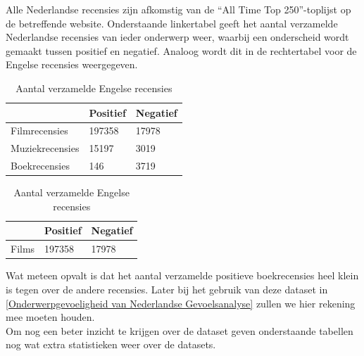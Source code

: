 Alle Nederlandse recensies zijn afkomstig van de ``All Time Top 250''-toplijst op de betreffende website. Onderstaande linkertabel geeft het aantal verzamelde Nederlandse recensies van ieder onderwerp weer, waarbij een onderscheid wordt gemaakt tussen positief en negatief. Analoog wordt dit in de rechtertabel voor de Engelse recensies weergegeven.\\

\begin{table}[h]
\centering
\setlength\tabcolsep{2pt}
\begin{minipage}[t]{0.48\textwidth}
\centering
\begin{tabular}{l|l|l|}
\cline{2-3}
                                      & Positief & Negatief \\ \hline
\multicolumn{1}{|l|}{Filmrecensies}   & 197358   & 17978    \\ \hline
\multicolumn{1}{|l|}{Muziekrecensies} & 15197    & 3019     \\ \hline
\multicolumn{1}{|l|}{Boekrecensies}   & 146      & 3719     \\ \hline
\end{tabular}
\caption{Aantal verzamelde Nederlandse recensies} 
\label{tabel: aantal verzamelde Nederlandse recensies}
\end{minipage}%
\hfill
\begin{minipage}[t]{0.48\textwidth}
\centering
\begin{tabular}{l|l|l|}
\cline{2-3}
                            & Positief & Negatief \\ \hline
\multicolumn{1}{|l|}{Films} & 197358   & 17978    \\ \hline
\end{tabular}
\caption{Aantal verzamelde Engelse recensies}
\end{minipage}
\end{table}

Wat meteen opvalt is dat het aantal verzamelde positieve boekrecensies heel klein is tegen over de andere recensies. Later bij het gebruik van deze dataset in \ref{Onderwerpgevoeligheid van Nederlandse Gevoelsanalyse} zullen we hier rekening mee moeten houden.\\

Om nog een beter inzicht te krijgen over de dataset geven onderstaande tabellen nog wat extra statistieken weer over de datasets.\\

